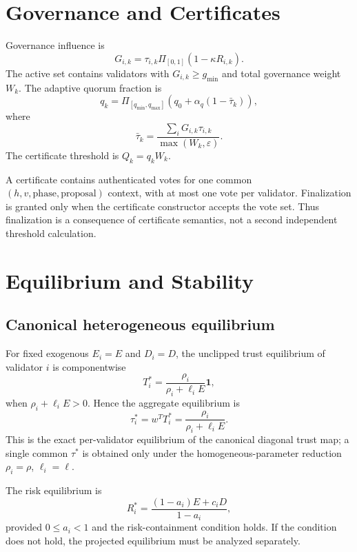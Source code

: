 \documentclass[10pt,journal]{IEEEtran}
\begin{document}
\section{Governance and Certificates}
Governance influence is
\begin{equation}
G_{i,k}=\tau_{i,k}\Pi_{[0,1]}(1-\kappa R_{i,k}).
\end{equation}
The active set contains validators with $G_{i,k}\ge g_{\min}$ and total governance weight $W_k$. The adaptive quorum fraction is
\begin{equation}
q_k=\Pi_{[q_{\min},q_{\max}]}
\left(q_0+\alpha_q(1-\bar\tau_k)\right),
\end{equation}
where
\begin{equation}
\bar\tau_k=\frac{\sum_iG_{i,k}\tau_{i,k}}{\max(W_k,\varepsilon)}.
\end{equation}
The certificate threshold is $Q_k=q_kW_k$.

A certificate contains authenticated votes for one common $(h,v,\text{phase},\text{proposal})$ context, with at most one vote per validator. Finalization is granted only when the certificate constructor accepts the vote set. Thus finalization is a consequence of certificate semantics, not a second independent threshold calculation.

\section{Equilibrium and Stability}
\subsection{Canonical heterogeneous equilibrium}
For fixed exogenous $E_i=E$ and $D_i=D$, the unclipped trust equilibrium of validator $i$ is componentwise
\begin{equation}
T_i^*=\frac{\rho_i}{\rho_i+\ell_iE}\mathbf{1},
\end{equation}
when $\rho_i+\ell_iE>0$. Hence the aggregate equilibrium is
\begin{equation}
\tau_i^*=w^TT_i^*=\frac{\rho_i}{\rho_i+\ell_iE}.
\end{equation}
This is the exact per-validator equilibrium of the canonical diagonal trust map; a single common $\tau^*$ is obtained only under the homogeneous-parameter reduction $\rho_i=\rho$, $\ell_i=\ell$.

The risk equilibrium is
\begin{equation}
R_i^*=\frac{(1-a_i)E+c_iD}{1-a_i},
\end{equation}
provided $0\le a_i<1$ and the risk-containment condition holds. If the condition does not hold, the projected equilibrium must be analyzed separately.
\end{document}
